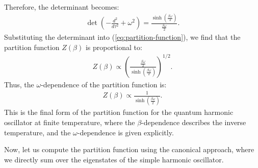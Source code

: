 \begin{enumerate}
\begin{align*}
    \end{align*}
    Therefore, the determinant becomes:
    \begin{align*}
        \det \left( -\frac{d^2}{d\tau^2} + \omega^2 \right) = \frac{\displaystyle\sinh\left(\frac{\beta\omega}{2}\right)}{\displaystyle\frac{\beta\omega}{2}}.
    \end{align*}
    Substituting the determinant into (\ref{eq:partition-function}), we find that the partition function $Z(\beta)$ is proportional to:
    \begin{align*}
        Z(\beta) \propto \left( \frac{\displaystyle\frac{\beta\omega}{2}}{\displaystyle\sinh\left(\frac{\beta\omega}{2}\right)} \right)^{1/2}.
    \end{align*}
    Thus, the $\omega$-dependence of the partition function is:
    \begin{align}
        Z(\beta) \propto \frac{1}{\displaystyle\sinh\left(\frac{\beta\omega}{2}\right)}.
    \end{align}
    This is the final form of the partition function for the quantum harmonic oscillator at finite temperature, where the $\beta$-dependence describes the inverse temperature, and the $\omega$-dependence is given explicitly.

    Now, let us compute the partition function using the canonical approach, where we directly sum over the eigenstates of the simple harmonic oscillator.


\end{enumerate}
